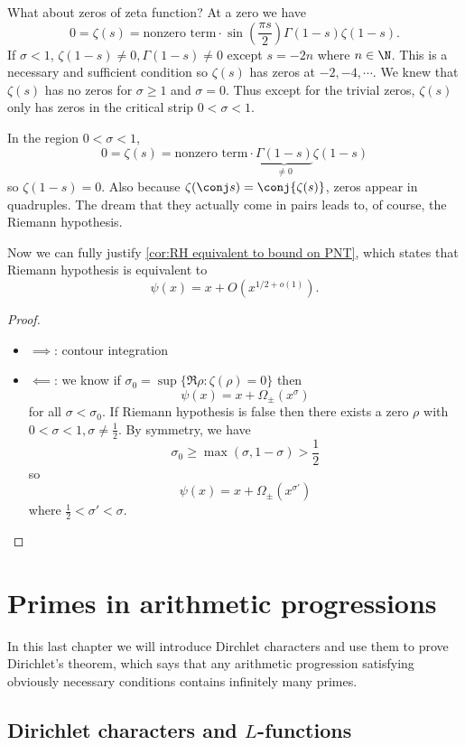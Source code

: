 \documentclass[a4paper]{article}
\theoremstyle{definition}
\begin{document}
What about zeros of zeta function? At a zero we have
\[
  0 = \zeta(s) = \text{nonzero term} \cdot \sin \left( \frac{\pi s}{2} \right) \Gamma(1 - s) \zeta(1 - s).
\]
If \(\sigma < 1\), \(\zeta(1 - s) \neq 0, \Gamma(1 - s) \neq 0\) except \(s = -2n\) where \(n \in \N\). This is a necessary and sufficient condition so \(\zeta(s)\) has zeros at \(-2, -4, \cdots\). We knew that \(\zeta(s)\) has no zeros for \(\sigma \geq 1\) and \(\sigma = 0\). Thus except for the trivial zeros, \(\zeta(s)\) only has zeros in the critical strip \(0 < \sigma < 1\).

In the region \(0 < \sigma < 1\),
\[
  0 = \zeta(s) = \text{nonzero term} \cdot \underbrace{\Gamma(1 - s)}_{\neq 0} \zeta(1 - s)
\]
so \(\zeta(1 - s) = 0\). Also because \(\zeta(\conj s) = \conj{\zeta(s)}\), zeros appear in quadruples. The dream that they actually come in pairs leads to, of course, the Riemann hypothesis.

Now we can fully justify \cref{cor:RH equivalent to bound on PNT}, which states that Riemann hypothesis is equivalent to
\[
  \psi(x) = x + O(x^{1/2 + o(1)}).
\]

\begin{proof}\leavevmode
  \begin{itemize}
  \item \(\implies\): contour integration
  \item \(\impliedby\): we know if \(\sigma_0 = \sup \{\Re \rho: \zeta(\rho) = 0\}\) then
    \[
      \psi(x) = x + \Omega_\pm (x^\sigma)
    \]
    for all \(\sigma < \sigma_0\). If Riemann hypothesis is false then there exists a zero \(\rho\) with \(0 < \sigma < 1, \sigma \neq \frac{1}{2}\). By symmetry, we have
    \[
      \sigma_0 \geq \max (\sigma, 1 - \sigma) > \frac{1}{2}
    \]
    so
    \[
      \psi(x) = x + \Omega_\pm(x^{\sigma'})
    \]
    where \(\frac{1}{2} < \sigma' < \sigma\).
  \end{itemize}
\end{proof}

\section{Primes in arithmetic progressions}

In this last chapter we will introduce Dirchlet characters and use them to prove Dirichlet's theorem, which says that any arithmetic progression satisfying obviously necessary conditions contains infinitely many primes.

\subsection{Dirichlet characters and \(L\)-functions}
\end{document}
